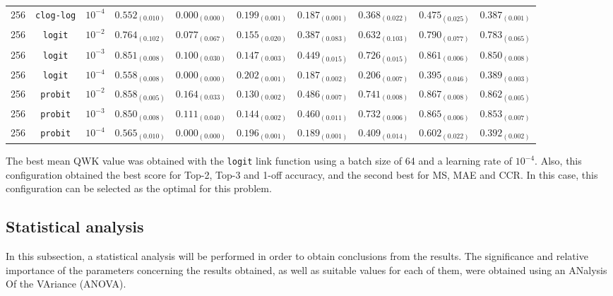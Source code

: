 \documentclass[journal]{IEEEtran}
\begin{document}
\begin{table}[!t]
\begin{tabular}{c@{\hskip 0.15cm}c@{\hskip 0.15cm}c@{\hskip 0.15cm}c@{\hskip 0.30cm}c@{\hskip 0.20cm}c@{\hskip 0.20cm}c@{\hskip 0.20cm}c@{\hskip 0.20cm}c@{\hskip 0.20cm}c}
			256 & \texttt{clog-log} & $10^{-4}$ & $0.552_{(0.010)}$ & $0.000_{(0.000)}$ & $0.199_{(0.001)}$ & $0.187_{(0.001)}$ & $0.368_{(0.022)}$ & $0.475_{(0.025)}$ & $0.387_{(0.001)}$\\
			256 & \texttt{logit} & $10^{-2}$ & $0.764_{(0.102)}$ & $0.077_{(0.067)}$ & $0.155_{(0.020)}$ & $0.387_{(0.083)}$ & $0.632_{(0.103)}$ & $0.790_{(0.077)}$ & $0.783_{(0.065)}$\\
			256 & \texttt{logit} & $10^{-3}$ & $0.851_{(0.008)}$ & $0.100_{(0.030)}$ & $0.147_{(0.003)}$ & $0.449_{(0.015)}$ & $0.726_{(0.015)}$ & $0.861_{(0.006)}$ & $0.850_{(0.008)}$\\
			256 & \texttt{logit} & $10^{-4}$ & $0.558_{(0.008)}$ & $0.000_{(0.000)}$ & $0.202_{(0.001)}$ & $0.187_{(0.002)}$ & $0.206_{(0.007)}$ & $0.395_{(0.046)}$ & $0.389_{(0.003)}$\\
			256 & \texttt{probit} & $10^{-2}$ & $0.858_{(0.005)}$ & $0.164_{(0.033)}$ & $0.130_{(0.002)}$ & $0.486_{(0.007)}$ & $0.741_{(0.008)}$ & $0.867_{(0.008)}$ & $0.862_{(0.005)}$\\
			256 & \texttt{probit} & $10^{-3}$ & $0.850_{(0.008)}$ & $0.111_{(0.040)}$ & $0.144_{(0.002)}$ & $0.460_{(0.011)}$ & $0.732_{(0.006)}$ & $0.865_{(0.006)}$ & $0.853_{(0.007)}$\\
			256 & \texttt{probit} & $10^{-4}$ & $0.565_{(0.010)}$ & $0.000_{(0.000)}$ & $0.196_{(0.001)}$ & $0.189_{(0.001)}$ & $0.409_{(0.014)}$ & $0.602_{(0.022)}$ & $0.392_{(0.002)}$\\
			\hline
			\hline
		\end{tabular}
	\end{table}
	
	The best mean QWK value was obtained with the \texttt{logit} link function using a batch size of 64 and a learning rate of $10^{-4}$. Also, this configuration obtained the best score for Top-2, Top-3 and 1-off accuracy, and the second best for MS, MAE and CCR. In this case, this configuration can be selected as the optimal for this problem.
	
	\subsection{Statistical analysis}
	\label{sect:statisticalanalysis}
	In this subsection, a statistical analysis will be performed in order to obtain conclusions from the results. The significance and relative importance of the parameters concerning the results obtained, as well as suitable values for each of them, were obtained using an ANalysis Of the VAriance (ANOVA).
	
\end{document}
